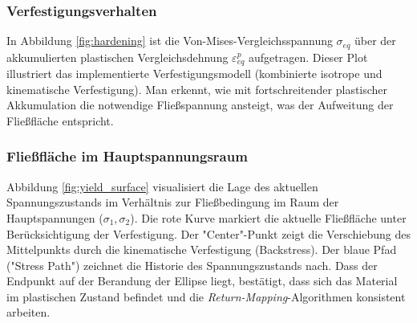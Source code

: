 \subsubsection{Verfestigungsverhalten}
In Abbildung \ref{fig:hardening} ist die Von-Mises-Vergleichsspannung $\sigma_{eq}$ über der akkumulierten plastischen Vergleichsdehnung $\varepsilon^p_{eq}$ aufgetragen. Dieser Plot illustriert das implementierte Verfestigungsmodell (kombinierte isotrope und kinematische Verfestigung). Man erkennt, wie mit fortschreitender plastischer Akkumulation die notwendige Fließspannung ansteigt, was der Aufweitung der Fließfläche entspricht.

\subsubsection{Fließfläche im Hauptspannungsraum}
Abbildung \ref{fig:yield_surface} visualisiert die Lage des aktuellen Spannungszustands im Verhältnis zur Fließbedingung im Raum der Hauptspannungen ($\sigma_1, \sigma_2$). 
Die rote Kurve markiert die aktuelle Fließfläche unter Berücksichtigung der Verfestigung.
Der "Center"-Punkt zeigt die Verschiebung des Mittelpunkts durch die kinematische Verfestigung (Backstress).
Der blaue Pfad ("Stress Path") zeichnet die Historie des Spannungszustands nach. Dass der Endpunkt auf der Berandung der Ellipse liegt, bestätigt, dass sich das Material im plastischen Zustand befindet und die \textit{Return-Mapping}-Algorithmen konsistent arbeiten.
